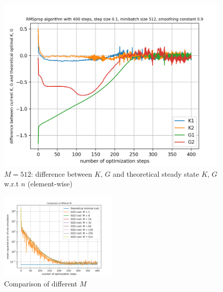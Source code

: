 \documentclass{article}
\begin{document}
\begin{figure}[h!]
\begin{minipage}[t]{.28\paperwidth}
		\includegraphics[width=1.0\textwidth]{Figures/d_M512_sep.png}
		\caption{$M=512$: difference between $K$, $G$ and theoretical steady state $K$, $G$ w.r.t $n$ (element-wise)\label{fig:d_M512_sep}}
	\end{minipage}
\end{figure}
\begin{figure}[h!]
	\centering
	\includegraphics[width=0.5\textwidth]{Figures/comp_M.png}
	\caption{Comparison of different $M$}
	\label{fig:comp_M}
\end{figure}
\clearpage
\end{document}
